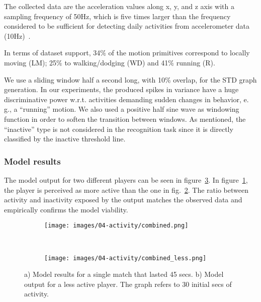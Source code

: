 The collected data are the acceleration values along x, y, and z axis with a sampling frequency of 50Hz, which is five times larger than the frequency considered to be sufficient for detecting daily activities from accelerometer data (10Hz)~\cite{kikhia_analyzing_2014}. %

In terms of dataset support, 34$\%$ of the motion primitives correspond to locally moving (LM); 25$\%$ to walking/dodging (WD) and 41$\%$ running (R). %

We use a sliding window half a second long, with 10\% overlap, for the STD graph generation. In our experiments, the produced spikes in variance have a huge discriminative power w.r.t. activities demanding sudden changes in behavior, e. g., a ``running'' motion. We also used a positive half sine wave as windowing function in order to soften the transition between windows. As mentioned, the ``inactive'' type is not considered in the recognition task since it is directly classified by the inactive threshold line. 

\subsubsection{Model results}
The model output for two different players can be seen in figure~\ref{fig:modelOutput}. In figure~\ref{fig:fun}, the player is perceived as more active than the one in fig.~\ref{fig:nofun}. The ratio between activity and inactivity exposed by the output matches the observed data and empirically confirms the model viability.

\begin{figure}[h]
    \centering 
	\begin{subfigure}[h]{\columnwidth}
		\centering      
		\texttt{[image: images/04-activity/combined.png]}
		\caption{}
		\label{fig:fun}
	\end{subfigure}
	~
	\begin{subfigure}[h]{\columnwidth}
		\centering      
      	\texttt{[image: images/04-activity/combined\_less.png]}
      	\caption{}
      	\label{fig:nofun}
     \end{subfigure}
      \caption{a) Model results for a single match that lasted 45 secs. b) Model output for a less active player. The graph refers to 30 initial secs of activity.}		
      \label{fig:modelOutput}
\end{figure}


